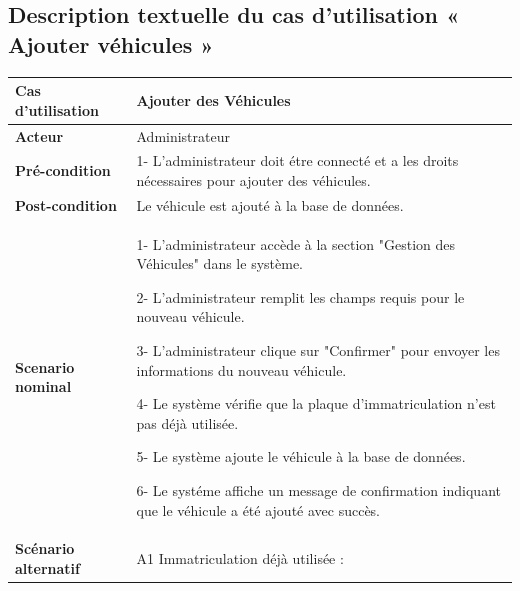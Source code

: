 
\subsection{Description textuelle du cas d’utilisation « Ajouter véhicules »}

\begin{table}[H]
  \centering
  \renewcommand{\arraystretch}{1.2} %
  \begin{tabular}{|p{4cm}|p{9cm}|}
    \hline
    \textbf{Cas d'utilisation}   & Ajouter des Véhicules                                                                          \\
    \hline
    \textbf{Acteur}              & Administrateur                                                                                 \\
    \hline
    \textbf{Pré-condition}       & 1- L'administrateur doit étre connecté et a les droits nécessaires pour ajouter des véhicules. \\
    \hline
    \textbf{Post-condition}      & Le véhicule est ajouté à la base de données.                                                   \\
    \hline
    \textbf{Scenario nominal}    & 1- L'administrateur accède à la section "Gestion des Véhicules" dans le système.\newline

    2- L'administrateur remplit les champs requis pour le nouveau véhicule.\newline

    3- L'administrateur clique sur "Confirmer" pour envoyer les informations du nouveau véhicule.\newline

    4- Le système vérifie que la plaque d'immatriculation n'est pas déjà utilisée.\newline

    5- Le système ajoute le véhicule à la base de données. \newline

    6- Le systéme affiche un message de confirmation indiquant que le véhicule a été ajouté avec succès.                          \\

    \hline
    \textbf{Scénario alternatif} & A1 Immatriculation déjà utilisée : \newline


\end{tabular}
\end{table}

